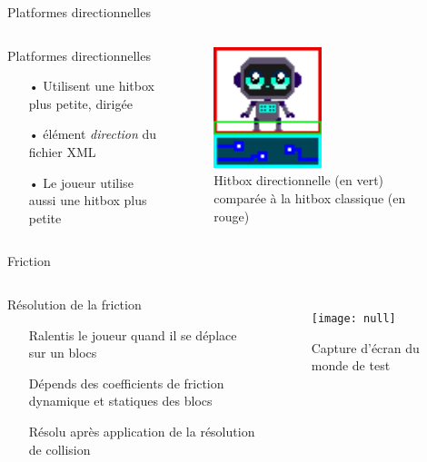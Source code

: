 \documentclass{beamer}
\begin{document}
{\begin{frame}{Platformes directionnelles}
    \begin{columns}
            \begin{block}{Platformes directionnelles}
                \begin{itemize}
                    \item[•] Utilisent une hitbox plus petite, dirigée
                    \item[•] élément \emph{direction} du fichier XML
                    \item[•] Le joueur utilise aussi une hitbox plus petite
                \end{itemize}
            \end{block}
            \begin{figure}
                \centering
                \includegraphics[width=0.5\textwidth]{DirectionnalHB.png}
                \caption{Hitbox directionnelle (en vert) comparée à la hitbox classique (en rouge)}
            \end{figure}
    \end{columns}
\end{frame}

\begin{frame}{Friction}
    \begin{columns}
        \begin{block}{Résolution de la friction}
            \begin{itemize}
                \item[\bullet] Ralentis le joueur quand il se déplace sur un blocs
                \item[\bullet] Dépends des coefficients de friction dynamique et statiques des blocs
                \item[\bullet] Résolu après application de la résolution de collision
            \end{itemize}
        \end{block}
        \begin{figure}
            \centering
            \texttt{[image: null]}
            \caption{Capture d'écran du monde de test}
        \end{figure}
    \end{columns}
\end{frame}

}
\end{document}
